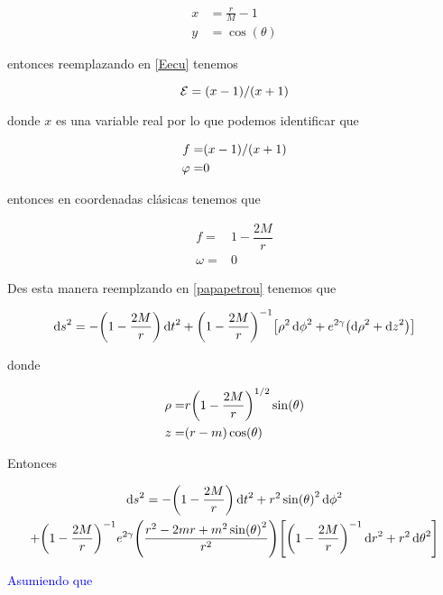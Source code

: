 \documentclass[../Main.tex]{subfiles}
\begin{document}
\begin{eqnarray}
    \label{xTor}
    x &= \frac{r}{M}-1 \\
    \label{yToTheta}
    y &= \cos(\theta)
\end{eqnarray}

entonces reemplazando en \eqref{Eecu} tenemos

\begin{equation}
    \mathcal{E}=\qty(x-1)/\qty(x+1)
\end{equation}

donde $x$ es una variable real por lo que podemos identificar que 

\begin{eqnarray}
    \label{fecures}
    f = & \qty(x-1)/\qty(x+1) \\
    \label{varphiecures}
    \varphi = & 0
\end{eqnarray}

entonces en coordenadas clásicas tenemos que

\begin{eqnarray}
    \label{fecuresSch}
    f = & 1-\dfrac{2M}{r} \\
    \label{omegaecuresSch}
    \omega = & 0
\end{eqnarray}

Des esta manera reemplzando en \eqref{papapetrou} tenemos que

\begin{equation}
    \dd{s}^{2} = -\qty(1-\dfrac{2M}{r})\dd{t}^{2}+\qty(1-\dfrac{2M}{r})^{-1}\qty[\rho^{2}\dd{\phi}^{2}+e^{2\gamma}\qty(\dd{\rho}^{2}+\dd{z}^{2})]
\end{equation}

donde

\begin{eqnarray}
    \label{rhoTortheta}
    \rho = & r\qty(1-\dfrac{2M}{r})^{1/2}\sin (\theta) \\
    \label{zTortheta}
    z = & \qty(r-m)\cos(\theta)
\end{eqnarray}

Entonces

\begin{multline*}
    \dd{s}^{2} = -\qty(1-\dfrac{2M}{r})\dd{t}^{2}+r^{2}\sin(\theta)^{2}\dd{\phi}^{2}\\
    +\qty(1-\dfrac{2M}{r})^{-1}e^{2\gamma}\qty(\dfrac{r^{2}-2mr+m^{2}\sin(\theta)^{2}}{r^{2}})\qty[\qty(1-\dfrac{2M}{r})^{-1}\dd{r}^{2}+r^{2}\dd{\theta}^{2}]
\end{multline*}

\textcolor{blue}{Asumiendo que}
\end{document}
